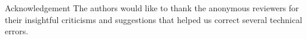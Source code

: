 \documentclass[journal]{IEEEtran}
\begin{document}
\begin{appendix}
\end{appendix}

\begin{section}{Acknowledgement}
	The authors would like to thank the anonymous reviewers for their insightful criticisms and suggestions that helped us correct several technical errors.
\end{section}



\end{document}
